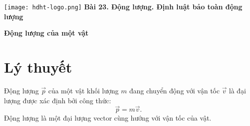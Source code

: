 \newcommand{\chapter}[2][]{
	\newcommand{\chapname}{#2}
	\begin{flushleft}
		\begin{minipage}[t]{\linewidth}
			\texttt{[image: hdht-logo.png]}
			\hspace{0pt}	
			\sffamily\bfseries\large Bài  23. Động lượng. Định luật bảo toàn động lượng
			\begin{flushleft}
				\huge\bfseries #1
			\end{flushleft}
		\end{minipage}
	\end{flushleft}
	\vspace{1cm}
	\normalfont\normalsize
}
\chapter[Động lượng của một vật]{Động lượng của một vật}
\section{Lý thuyết}
Động lượng $\vec{p}$ của một vật khối lượng $m$ đang chuyển động với vận tốc $\vec{v}$ là đại lượng được xác định bởi công thức:
\begin{equation}
	\vec{p}=m\vec{v}.
\end{equation}
Động lượng là một đại lượng vector cùng hướng với vận tốc của vật.
